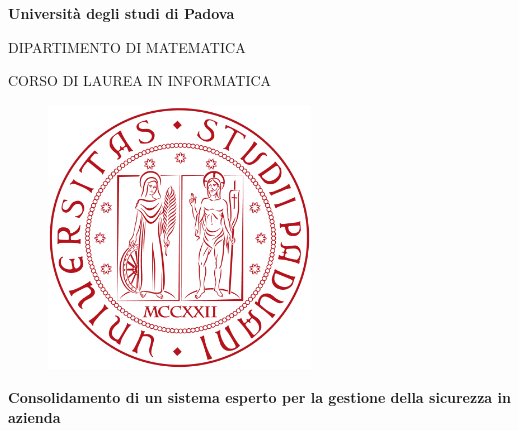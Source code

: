 \begin{titlepage}

\begin{center}

\begin{LARGE}
\textbf{Università degli studi di Padova}\\
\end{LARGE}

\vspace{10pt}

\begin{Large}
\textsc{DIPARTIMENTO DI MATEMATICA}\\
\end{Large}

\vspace{10pt}

\begin{large}
\textsc{CORSO DI LAUREA IN INFORMATICA}\\
\end{large}

\vspace{30pt}
\begin{figure}[htbp]
\begin{center}
\includegraphics[height=7cm]{Pics/logo-unipd.png}
\end{center}
\end{figure}
\vspace{30pt} 

\begin{LARGE}
\begin{center}
\textbf{Consolidamento di un sistema esperto per la gestione della sicurezza in azienda}\\
\end{center}
\end{LARGE}

\vspace{10pt} 


\end{center}
\end{titlepage}
